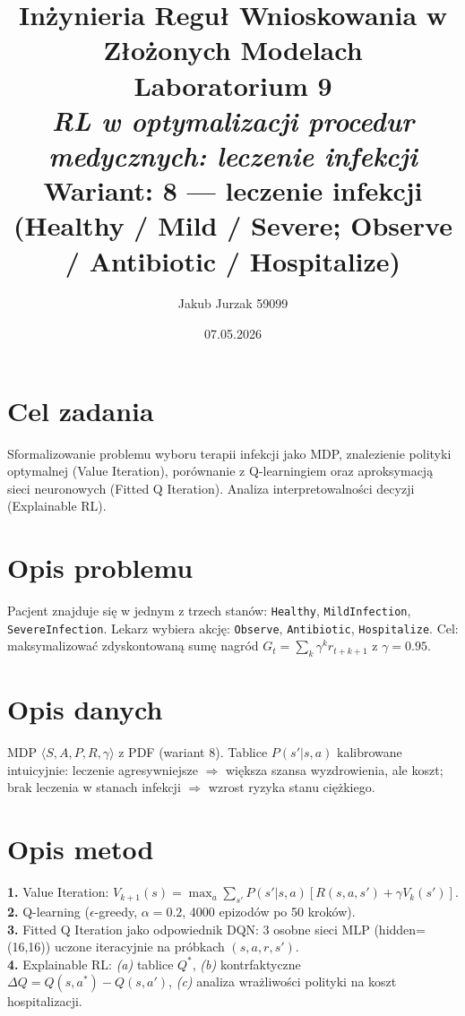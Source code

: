 \documentclass[12pt,a4paper]{article}
\title{
  \vspace{2cm}
  \LARGE\textbf{Inżynieria Reguł Wnioskowania w Złożonych Modelach}\\[0.6cm]
  \Large Laboratorium 9\\[0.4cm]
  \large \textit{RL w optymalizacji procedur medycznych: leczenie infekcji}\\[0.3cm]
  \normalsize Wariant: \textbf{8 — leczenie infekcji (Healthy / Mild / Severe; Observe / Antibiotic / Hospitalize)}
}
\author{Jakub Jurzak 59099}
\date{07.05.2026}
\begin{document}
\maketitle
\thispagestyle{empty}
\newpage

\tableofcontents
\newpage

\section{Cel zadania}
Sformalizowanie problemu wyboru terapii infekcji jako MDP, znalezienie polityki optymalnej (Value Iteration), porównanie z Q-learningiem oraz aproksymacją sieci neuronowych (Fitted Q Iteration). Analiza interpretowalności decyzji (Explainable RL).

\section{Opis problemu}
Pacjent znajduje się w jednym z trzech stanów: \texttt{Healthy}, \texttt{MildInfection}, \texttt{SevereInfection}. Lekarz wybiera akcję: \texttt{Observe}, \texttt{Antibiotic}, \texttt{Hospitalize}. Cel: maksymalizować zdyskontowaną sumę nagród $G_t = \sum_k \gamma^k r_{t+k+1}$ z $\gamma=0.95$.

\section{Opis danych}
MDP $\langle S,A,P,R,\gamma\rangle$ z PDF (wariant 8). Tablice $P(s'|s,a)$ kalibrowane intuicyjnie: leczenie agresywniejsze $\Rightarrow$ większa szansa wyzdrowienia, ale koszt; brak leczenia w stanach infekcji $\Rightarrow$ wzrost ryzyka stanu ciężkiego.

\section{Opis metod}
\textbf{1.} Value Iteration: $V_{k+1}(s) = \max_a \sum_{s'} P(s'|s,a)[R(s,a,s') + \gamma V_k(s')]$.\\\textbf{2.} Q-learning ($\epsilon$-greedy, $\alpha=0.2$, 4000 epizodów po 50 kroków).\\\textbf{3.} Fitted Q Iteration jako odpowiednik DQN: 3 osobne sieci MLP (hidden=(16,16)) uczone iteracyjnie na próbkach $(s, a, r, s')$.\\\textbf{4.} Explainable RL: \textit{(a)} tablice $Q^*$, \textit{(b)} kontrfaktyczne $\Delta Q = Q(s, a^*) - Q(s, a')$, \textit{(c)} analiza wrażliwości polityki na koszt hospitalizacji.
\end{document}
